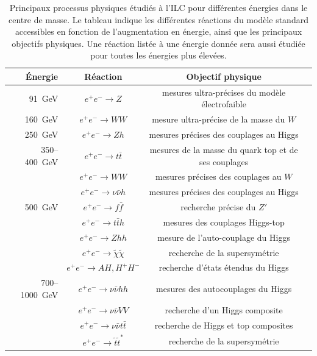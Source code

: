  \begin{table}[htb!] 
  \footnotesize{
  \begin{center}
  \begin{tabular}{rccc}
  \'Energie             &   R\'eaction  &  Objectif physique     
  \\  \hline \hline
  91~GeV            &       $e^+e^-  \to Z$     &      
   mesures ultra-pr\'ecises du mod\`ele \'electrofaible        \\   \hline
  160~GeV            &       $e^+e^-  \to WW$     &
  mesure ultra-pr\'ecise de la masse du $W$         \\   \hline
  250~GeV         &    $e^+e^-  \to Z h$     &      mesures pr\'ecises des couplages au Higgs           \\ 
			    \hline
  350--400~GeV         &      $e^+e^-  \to t\bar t$        &  
    mesures de la masse du quark top et de ses couplages                \\
    &    $ e^+e^-  \to WW$     &     mesures pr\'ecises des couplages au $W$             \\ 
			&     $ e^+e^-  \to \nu\bar\nu h $   & 
  mesures pr\'ecises des couplages au Higgs     \\   \hline
  500~GeV         &      $e^+e^-  \to f\bar f   $       &   
  recherche précise du $Z'$      \\ 
      &  $ e^+e^-  \to t\bar t h$    &      mesures des couplages Higgs-top      \\
			  &      $e^+e^-  \to Z h h $       &     mesure de l'auto-couplage du Higgs            \\
			&   $   e^+e^- \to  \tilde \chi \tilde \chi$  &
			recherche de la supersym\'etrie   \\  
			&    $  e^+e^- \to AH, H^+H^-  $  &
			recherche d'\'etats \'etendus du Higgs   \\  \hline
  700--1000~GeV &        $ e^+e^-  \to \nu\bar \nu hh $ & 
	  mesures des autocouplages du Higgs     \\ 
			    &    $e^+e^-  \to \nu\bar \nu VV$ &  recherche d'un Higgs composite  \\ 
			    &    $e^+e^-  \to \nu\bar \nu t\bar t$ &
			    recherche de Higgs et top composites  \\
			    &    $e^+e^-  \to \tilde t \tilde{ t}^* $ &
			  recherche de la supersym\'etrie  \\
			    \hline
  \end{tabular}
  \end{center} }
  \caption{Principaux processus physiques \'etudi\'es \`a l'ILC pour diff\'erentes \'energies dans le centre de masse. Le tableau indique les diff\'erentes réactions du mod\`ele standard accessibles en fonction de l'augmentation en \'energie, ainsi que les principaux objectifs physiques. Une r\'eaction list\'ee \`a une \'energie donn\'ee sera aussi \'etudi\'ee pour toutes les \'energies plus \'elev\'ees.}
  \label{tab:ILCprogramX}
  \end{table}
   
